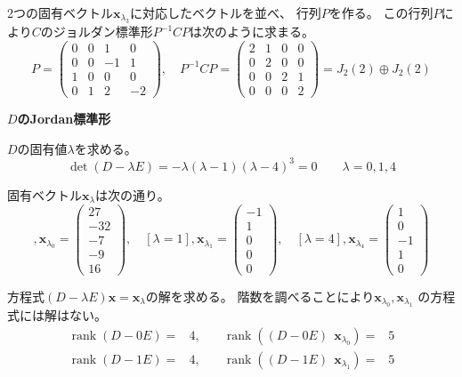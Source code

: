 \documentclass[12pt,b5paper]{ltjsarticle}
\newcommand{\Rnk}{\mathop{\mathrm{rank}}\nolimits}
\begin{document}
2つの固有ベクトル$\bm{x}_{\lambda_3}$に対応したベクトルを並べ、
行列$P$を作る。
この行列$P$により$C$のジョルダン標準形$P^{-1}CP$は次のように求まる。
\begin{equation}
 P=
 \begin{pmatrix}
  0 & 0 & 1 & 0\\
  0 & 0 & -1 & 1\\
  1 & 0 & 0 & 0\\
  0 & 1 & 2 & -2
 \end{pmatrix}
 ,\quad
 P^{-1}CP=
 \begin{pmatrix}
  2 & 1 & 0 & 0\\
  0 & 2 & 0 & 0\\
  0 & 0 & 2 & 1\\
  0 & 0 & 0 & 2
 \end{pmatrix}
 =J_2(2) \oplus J_2(2)
\end{equation}



\dotfill
\textbf{$D$のJordan標準形}
\dotfill

$D$の固有値$\lambda$を求める。
\begin{equation}
 \det(D-\lambda E)=-\lambda(\lambda-1)(\lambda-4)^3=0
  \qquad \lambda=0,1,4
\end{equation}

固有ベクトル$\bm{x}_{\lambda}$は次の通り。
\begin{equation}
 [\lambda =0] ,
 \bm{x}_{\lambda_0}=
 \begin{pmatrix}27\\-32\\-7\\-9\\16\end{pmatrix},\quad
%
 [\lambda =1] ,
 \bm{x}_{\lambda_1}=
 \begin{pmatrix}-1\\1\\0\\0\\0\end{pmatrix},\quad
%
 [\lambda =4] ,
 \bm{x}_{\lambda_4}=
 \begin{pmatrix}1\\0\\-1\\1\\0\end{pmatrix}
\end{equation}

方程式$(D-\lambda E)\bm{x}=\bm{x}_{\lambda}$の解を求める。
階数を調べることにより$\bm{x}_{\lambda_0},\bm{x}_{\lambda_1}$
の方程式には解はない。
\begin{align}
 \Rnk(D-0E)=&4, & \quad \Rnk((D-0E) \ \ \bm{x}_{\lambda_0})=&5\\
 \Rnk(D-1E)=&4, & \quad \Rnk((D-1E) \ \ \bm{x}_{\lambda_1})=&5
\end{align}
\end{document}
